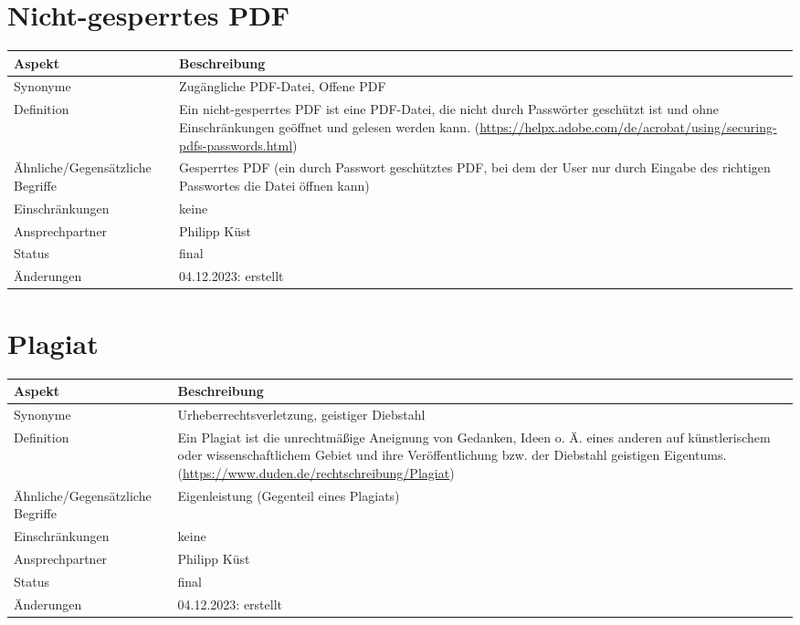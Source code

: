\section{Nicht-gesperrtes PDF}\label{sec:glossar_nicht_gesperrtes_pdf}
\begin{tabularx}{\textwidth}{|l|X|}
    \hline
    \textbf{Aspekt} & \textbf{Beschreibung} \\
    \hline
    Synonyme & Zugängliche PDF-Datei, Offene PDF \\
    \hline
    Definition & Ein nicht-gesperrtes PDF ist eine PDF-Datei, die nicht durch Passwörter geschützt ist und ohne  Einschränkungen geöffnet und gelesen werden kann.
    (\url{https://helpx.adobe.com/de/acrobat/using/securing-pdfs-passwords.html}) \\
    \hline
    Ähnliche/Gegensätzliche Begriffe & Gesperrtes PDF (ein durch Passwort geschütztes PDF, bei dem der User nur durch  Eingabe des richtigen Passwortes die Datei öffnen kann) \\
    \hline
    Einschränkungen & keine \\
    \hline
    Ansprechpartner & Philipp Küst \\
    \hline
    Status & final \\
    \hline
    Änderungen & 04.12.2023: erstellt \\
    \hline
\end{tabularx}

\section{Plagiat}\label{sec:glossar_plagiat}
\begin{tabularx}{\textwidth}{|l|X|}
    \hline
    \textbf{Aspekt} & \textbf{Beschreibung} \\
    \hline
    Synonyme & Urheberrechtsverletzung, geistiger Diebstahl \\
    \hline
    Definition & Ein Plagiat ist die unrechtmäßige Aneignung von Gedanken, Ideen o. Ä. eines anderen auf künstlerischem  oder wissenschaftlichem Gebiet und ihre Veröffentlichung bzw. der Diebstahl geistigen Eigentums.
    (\url{https://www.duden.de/rechtschreibung/Plagiat}) \\
    \hline
    Ähnliche/Gegensätzliche Begriffe & Eigenleistung (Gegenteil eines Plagiats) \\
    \hline
    Einschränkungen & keine \\
    \hline
    Ansprechpartner & Philipp Küst \\
    \hline
    Status & final \\
    \hline
    Änderungen & 04.12.2023: erstellt \\
    \hline
\end{tabularx}


